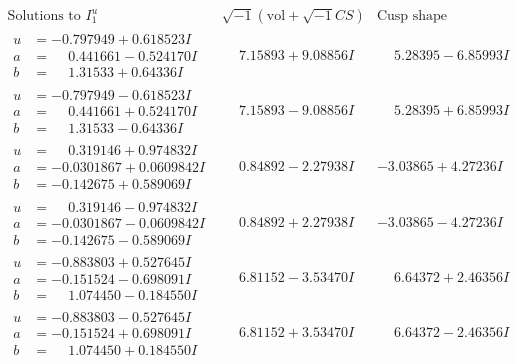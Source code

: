 \documentclass[1p]{elsarticle_modified}
\theoremstyle{definition}
\newcommand{\I}{\sqrt{-1}}
\begin{document}
$$\begin{array}{c|c|c}  
\text{Solutions to }I^u_{1}& \I (\text{vol} + \sqrt{-1}CS) & \text{Cusp shape}\\
 \hline 
\begin{aligned}
u &= -0.797949 + 0.618523 I \\
a &= \phantom{-}0.441661 - 0.524170 I \\
b &= \phantom{-}1.31533 + 0.64336 I\end{aligned}
 & \phantom{-}7.15893 + 9.08856 I & \phantom{-}5.28395 - 6.85993 I \\ \hline\begin{aligned}
u &= -0.797949 - 0.618523 I \\
a &= \phantom{-}0.441661 + 0.524170 I \\
b &= \phantom{-}1.31533 - 0.64336 I\end{aligned}
 & \phantom{-}7.15893 - 9.08856 I & \phantom{-}5.28395 + 6.85993 I \\ \hline\begin{aligned}
u &= \phantom{-}0.319146 + 0.974832 I \\
a &= -0.0301867 + 0.0609842 I \\
b &= -0.142675 + 0.589069 I\end{aligned}
 & \phantom{-}0.84892 - 2.27938 I & -3.03865 + 4.27236 I \\ \hline\begin{aligned}
u &= \phantom{-}0.319146 - 0.974832 I \\
a &= -0.0301867 - 0.0609842 I \\
b &= -0.142675 - 0.589069 I\end{aligned}
 & \phantom{-}0.84892 + 2.27938 I & -3.03865 - 4.27236 I \\ \hline\begin{aligned}
u &= -0.883803 + 0.527645 I \\
a &= -0.151524 - 0.698091 I \\
b &= \phantom{-}1.074450 - 0.184550 I\end{aligned}
 & \phantom{-}6.81152 - 3.53470 I & \phantom{-}6.64372 + 2.46356 I \\ \hline\begin{aligned}
u &= -0.883803 - 0.527645 I \\
a &= -0.151524 + 0.698091 I \\
b &= \phantom{-}1.074450 + 0.184550 I\end{aligned}
 & \phantom{-}6.81152 + 3.53470 I & \phantom{-}6.64372 - 2.46356 I \\ \hline\begin{aligned}

\end{aligned}
\end{array}$$
\end{document}
